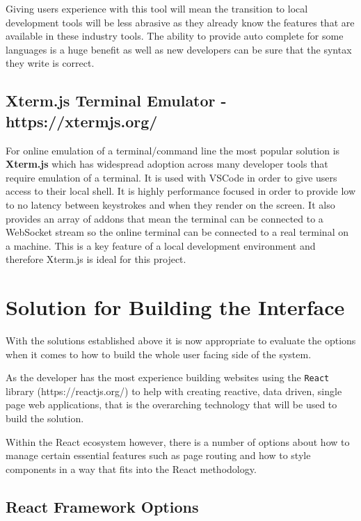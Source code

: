 Giving users experience with this tool will mean the transition to local development tools will be less abrasive as they already know the features that are available in these industry tools. The ability to provide auto complete for some languages is a huge benefit as well as new developers can be sure that the syntax they write is correct.

\subsection{Xterm.js Terminal Emulator - https://xtermjs.org/}

For online emulation of a terminal/command line the most popular solution is \textbf{Xterm.js} which has widespread adoption across many developer tools that require emulation of a terminal. It is used with VSCode in order to give users access to their local shell. It is highly performance focused in order to provide low to no latency between keystrokes and when they render on the screen. It also provides an array of addons that mean the terminal can be connected to a WebSocket stream so the online terminal can be connected to a real terminal on a machine. This is a key feature of a local development environment and therefore Xterm.js is ideal for this project.

\section{Solution for Building the Interface} \label{solapp-tools}

With the solutions established above it is now appropriate to evaluate the options when it comes to how to build the whole user facing side of the system.

As the developer has the most experience building websites using the \texttt{React} library (https://reactjs.org/) to help with creating reactive, data driven, single page web applications, that is the overarching technology that will be used to build the solution.

Within the React ecosystem however, there is a number of options about how to manage certain essential features such as page routing and how to style components in a way that fits into the React methodology.

\subsection{React Framework Options}

